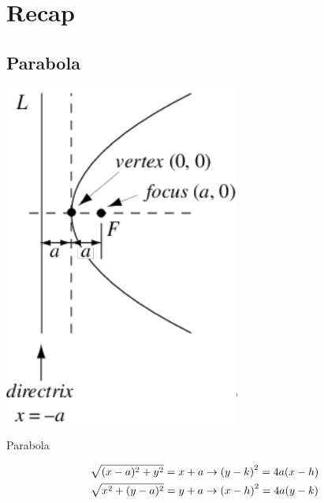 \documentclass[../main-notes.tex]{subfile}
\begin{document}
\section{Recap}

\subsection{Parabola}

\begin{marginfigure}
    \centering
    \includegraphics[width=\textwidth]{../Figures/parabola/ParabolaDirectrix_1002.png}
    \caption{Parabola}\label{fig-parabola-recap}
\end{marginfigure}


\begin{gather*}
    \sqrt{(x-a)^2 + y^2} = x+a\to\qty(y-k)^2 = 4a\qty(x-h) \\
    \sqrt{x^2 + (y-a)^2} = y+a\to\qty(x-h)^2 = 4a\qty(y-k)
\end{gather*}
\end{document}
